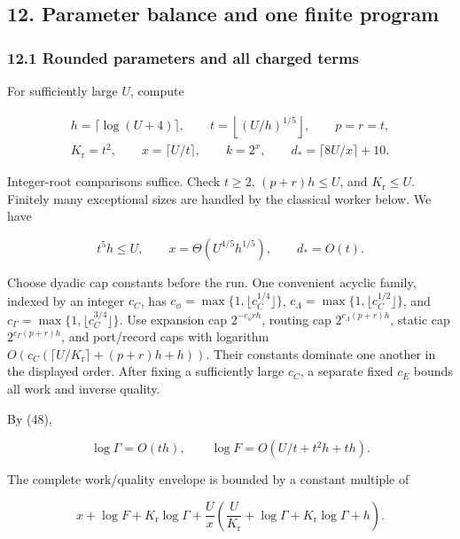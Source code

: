 \hypertarget{af-46593eb93e-parameter-balance-and-one-finite-program}{%
\subsection{12. Parameter balance and one finite program}\label{af-46593eb93e-parameter-balance-and-one-finite-program}}

\hypertarget{af-46593eb93e-rounded-parameters-and-all-charged-terms}{%
\subsubsection{12.1 Rounded parameters and all charged terms}\label{af-46593eb93e-rounded-parameters-and-all-charged-terms}}

For sufficiently large \(U\), compute

\[
\begin{gathered}
 h=\lceil\log(U+4)\rceil,\qquad
 t=\left\lfloor(U/h)^{1/5}\right\rfloor,\qquad
 p=r=t,\\
 K_{\mathrm r}=t^2,\qquad x=\lceil U/t\rceil,\qquad
 k=2^x,\qquad d_*=\lceil8U/x\rceil+10.
\end{gathered}
 \tag{73}
\]

Integer-root comparisons suffice. Check \(t\geq2\), \((p+r)h\leq U\), and \(K_{\mathrm r}\leq U\). Finitely many exceptional sizes are handled by the classical worker below. We have

\[
t^5h\leq U,\qquad
 x=\Theta(U^{4/5}h^{1/5}),\qquad d_*=O(t).
 \tag{74}
\]

Choose dyadic cap constants before the run. One convenient acyclic family, indexed by an integer \(c_C\), has \(c_\phi=\max\{1,\lfloor c_C^{1/4}\rfloor\}\), \(c_\Lambda=\max\{1,\lfloor c_C^{1/2}\rfloor\}\), and \(c_\Gamma=\max\{1,\lfloor c_C^{3/4}\rfloor\}\). Use expansion cap \(2^{-c_\phi rh}\), routing cap \(2^{c_\Lambda(p+r)h}\), static cap \(2^{c_\Gamma(p+r)h}\), and port/record caps with logarithm \(O(c_C(\lceil U/K_{\mathrm r}\rceil+(p+r)h+h))\). Their constants dominate one another in the displayed order. After fixing a sufficiently large \(c_C\), a separate fixed \(c_E\) bounds all work and inverse quality.

By (48),

\[
\log\Gamma=O(th),\qquad
 \log F=O(U/t+t^2h+th).
 \tag{75}
\]

The complete work/quality envelope is bounded by a constant multiple of

\[
x+\log F+K_{\mathrm r}\log\Gamma+
       \frac Ux\left(\frac{U}{K_{\mathrm r}}
                  +\log\Gamma+K_{\mathrm r}\log\Gamma+h\right).
 \tag{76}
\]

